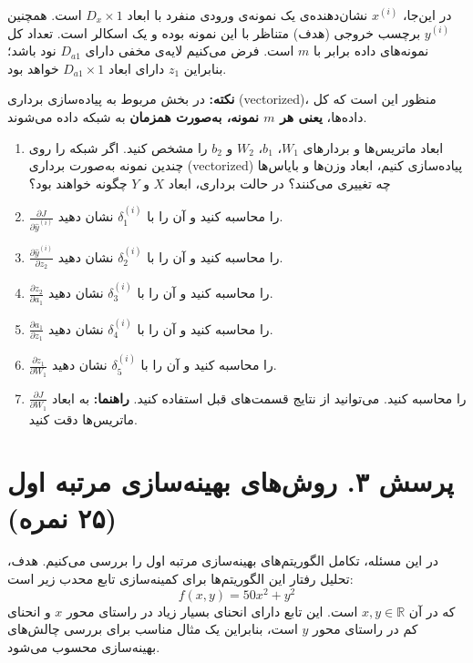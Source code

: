 در این‌جا، $x^{(i)}$ نشان‌دهنده‌ی یک نمونه‌ی ورودی منفرد با ابعاد $D_x \times 1$ است. همچنین $y^{(i)}$ برچسب خروجی (هدف) متناظر با این نمونه بوده و یک اسکالر است. تعداد کل نمونه‌های داده برابر با $m$ است. فرض می‌کنیم لایه‌ی مخفی دارای $D_{a1}$ نود باشد؛ بنابراین $z_1$ دارای ابعاد $D_{a1} \times 1$ خواهد بود.

\textbf{نکته:} در بخش مربوط به پیاده‌سازی برداری (vectorized)، منظور این است که کل داده‌ها، \textbf{یعنی هر $m$ نمونه، به‌صورت همزمان} به شبکه داده می‌شوند.

\begin{enumerate}
    \item ابعاد ماتریس‌ها و بردارهای $W_1$، $b_1$، $W_2$ و $b_2$ را مشخص کنید. اگر شبکه را روی چندین نمونه به‌صورت برداری (vectorized) پیاده‌سازی کنیم، ابعاد وزن‌ها و بایاس‌ها چه تغییری می‌کنند؟ در حالت برداری، ابعاد $X$ و $Y$ چگونه خواهند بود؟
    \item $\frac{\partial J}{\partial \hat{y}^{(i)}}$ را محاسبه کنید و آن را با $\delta_1^{(i)}$ نشان دهید.
    \item $\frac{\partial \hat{y}^{(i)}}{\partial z_2}$ را محاسبه کنید و آن را با $\delta_2^{(i)}$ نشان دهید.
    \item $\frac{\partial z_2}{\partial a_1}$ را محاسبه کنید و آن را با $\delta_3^{(i)}$ نشان دهید.
    \item $\frac{\partial a_1}{\partial z_1}$ را محاسبه کنید و آن را با $\delta_4^{(i)}$ نشان دهید.
    \item $\frac{\partial z_1}{\partial W_1}$ را محاسبه کنید و آن را با $\delta_5^{(i)}$ نشان دهید.
    \item $\frac{\partial J}{\partial W_1}$ را محاسبه کنید. می‌توانید از نتایج قسمت‌های قبل استفاده کنید. \textbf{راهنما:} به ابعاد ماتریس‌ها دقت کنید.
\end{enumerate}

\section*{پرسش ۳. روش‌های بهینه‌سازی مرتبه اول (۲۵ نمره)}

در این مسئله، تکامل الگوریتم‌های بهینه‌سازی مرتبه اول را بررسی می‌کنیم. هدف، تحلیل رفتار این الگوریتم‌ها برای کمینه‌سازی تابع محدب زیر است:
\begin{equation*}
    f(x, y) = 50x^2 + y^2
\end{equation*}
که در آن $x, y \in \mathbb{R}$ است. این تابع دارای انحنای بسیار زیاد در راستای محور $x$ و انحنای کم در راستای محور $y$ است، بنابراین یک مثال مناسب برای بررسی چالش‌های بهینه‌سازی محسوب می‌شود.

